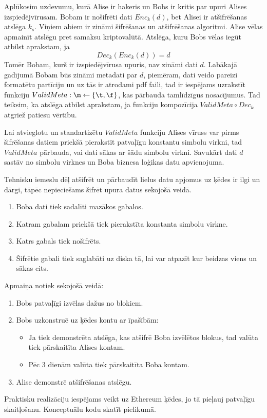 Aplūkosim uzdevumu, kurā Alise ir hakeris un Bobs ir kritis par upuri Alises izspiedējvīrusam.
Bobam ir nošifrēti dati $Enc_k(d)$, bet Alisei ir atšifrēšanas atslēga $k_s$. Viņiem abiem ir zināmi šifrēšanas un atšifrēšanas algoritmi. Alise vēlas apmainīt atslēgu pret samaksu kriptovalūtā. Atslēga, kuru Bobs vēlas iegūt atbilst aprakstam, ja
\begin{equation*}
    Dec_k(Enc_k(d)) = d
\end{equation*}
Tomēr Bobam, kurš ir izspiedējvīrusa upuris, nav zināmi dati $d$. Labākajā gadījumā Bobam būs zināmi metadati par $d$, piemēram, dati veido pareizi formatētu partīciju un uz tās ir atrodami pdf faili, tad ir iespējams uzrakstīt funkciju $ValidMeta: \m \leftarrow \left\{ \t,\f \right\}$, kas pārbauda tamlīdzīgus nosacījumus. Tad teiksim, ka atslēga atbilst aprakstam, ja funkciju kompozīcija $ValidMeta \circ Dec_k$ atgriež patiesu vērtību.

Lai atvieglotu un standartizētu $ValidMeta$ funkciju Alises vīruss var pirms šifrēšanas datiem priekšā pierakstīt patvaļīgu konstantu simbolu virkni, tad $ValidMeta$ pārbauda, vai dati sākas ar šādu simbolu virkni. Savukārt dati $d$ sastāv no simbolu virknes un Boba biznesa loģikas datu apvienojuma.

Tehnisku iemeslu dēļ atšifrēt un pārbaudīt lielus datu apjomus uz ķēdes ir ilgi un dārgi, tāpēc nepieciešams šifrēt upura datus sekojošā veidā.
\begin{enumerate}
    \item Boba dati tiek sadalīti mazākos gabalos.
    \item Katram gabalam priekšā tiek pierakstīta konstanta simbolu virkne.
    \item Katrs gabals tiek nošifrēts.
    \item Šifrētie gabali tiek saglabāti uz diska tā, lai var atpazīt kur beidzas viens un sākas cits.
\end{enumerate}
Apmaiņa notiek sekojošā veidā:
\begin{enumerate}
    \item Bobs patvaļīgi izvēlas dažus no blokiem.
    \item Bobs uzkonstruē uz ķēdes kontu ar īpašībām:
        \begin{itemize}
            \item Ja tiek demonstrēta atslēga, kas atšifrē Boba izvēlētos blokus, tad valūta tiek pārskaitīta Alises kontam.
            \item Pēc 3 dienām valūta tiek pārskaitīta Boba kontam.
        \end{itemize}
    \item Alise demonstrē atšifrēšanas atslēgu.
\end{enumerate}

Praktisku realizāciju iespējams veikt uz Ethereum ķēdes, jo tā pieļauj patvaļīgu skaitļošanu. Konceptuālu kodu skatīt pielikumā.

